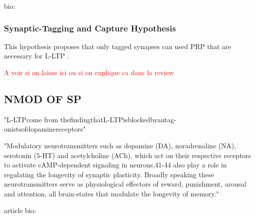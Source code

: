 bio: \citep{debanne_spike-timing_2010}

\subsubsection{Synaptic-Tagging and Capture Hypothesis}
This hypothesis proposes that only tagged synapses can used \acrfull{PRP} that are necessary for \acrshort{L-LTP} \citep{baltaci_molecular_2019, abraham_is_2019}.

\textcolor{red}{A voir si on laisse ici ou si on explique ca dans la review}


\subsection{NMOD OF SP}
\citep{frey_effects_1993} "L-LTPcome from thefindingthatL-LTPisblockedbyantag- onistsofdopaminereceptors"


"Modulatory neurotransmitters such as dopamine (DA), noradrenaline (NA), serotonin (5-HT) and acetylcholine (ACh), which act on their respective receptors to activate cAMP-dependent signaling in neurons,41-44 also play a role in regulating the longevity of synaptic plasticity. Broadly speaking these neurotransmitters serve as physiological effectors of reward, punishment, arousal and attention, all brain-states that modulate the longevity of memory."


article bio: \citep{lisman_neohebbian_2011, lerner_neuromodulatory_2011}\\
~\\


\color{black} 

